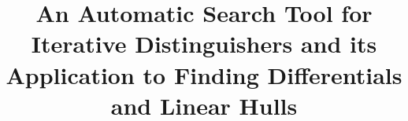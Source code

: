 \documentclass[runningheads]{llncs}
\begin{document}
%
\title{An Automatic Search Tool for Iterative Distinguishers and its Application to Finding Differentials and Linear Hulls
}
%
%
%
%
%
\maketitle              %
%
\end{document}
